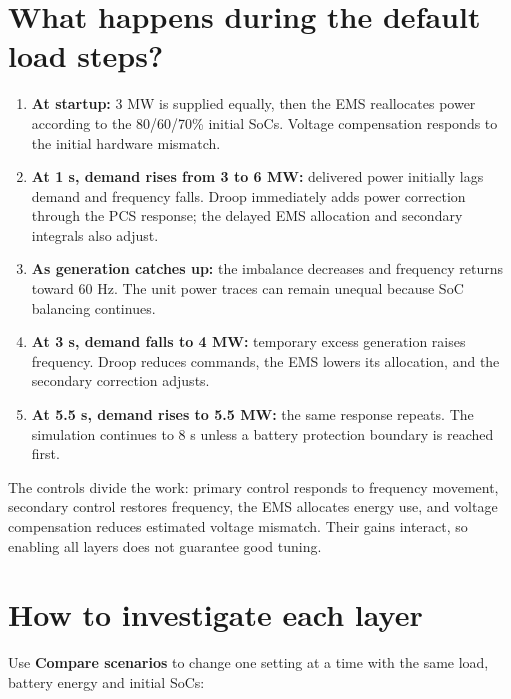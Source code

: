\documentclass[11pt,a4paper]{article}
\begin{document}
\section{What happens during the default load steps?}

\begin{enumerate}
\item \textbf{At startup:} 3 MW is supplied equally, then the EMS reallocates power according to the 80/60/70\% initial SoCs. Voltage compensation responds to the initial hardware mismatch.
\item \textbf{At 1 s, demand rises from 3 to 6 MW:} delivered power initially lags demand and frequency falls. Droop immediately adds power correction through the PCS response; the delayed EMS allocation and secondary integrals also adjust.
\item \textbf{As generation catches up:} the imbalance decreases and frequency returns toward 60 Hz. The unit power traces can remain unequal because SoC balancing continues.
\item \textbf{At 3 s, demand falls to 4 MW:} temporary excess generation raises frequency. Droop reduces commands, the EMS lowers its allocation, and the secondary correction adjusts.
\item \textbf{At 5.5 s, demand rises to 5.5 MW:} the same response repeats. The simulation continues to 8 s unless a battery protection boundary is reached first.

\end{enumerate}
The controls divide the work: primary control responds to frequency movement, secondary control restores frequency, the EMS allocates energy use, and voltage compensation reduces estimated voltage mismatch. Their gains interact, so enabling all layers does not guarantee good tuning.

\section{How to investigate each layer}

Use \textbf{Compare scenarios} to change one setting at a time with the same load, battery energy and initial SoCs:
\end{document}
